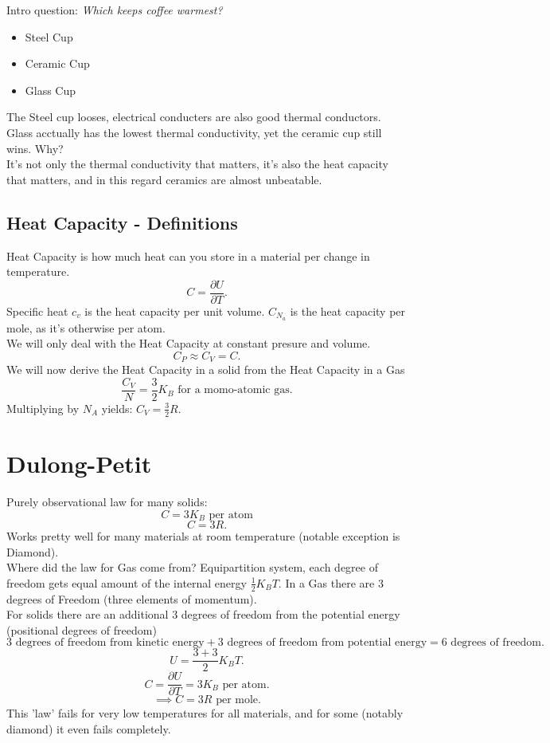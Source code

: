 \documentclass{report}
\begin{document}
Intro question: \emph{Which keeps coffee warmest?}
\begin{itemize}
	\item Steel Cup \\
	\item Ceramic Cup \\
	\item Glass Cup 
\end{itemize}
The Steel cup looses, electrical conducters are also good thermal conductors. Glass acctually has the lowest thermal conductivity, yet the ceramic cup still wins. Why? \\
It's not only the thermal conductivity that matters, it's also the heat capacity that matters, and in this regard ceramics are almost unbeatable.\\
\subsection{Heat Capacity - Definitions}
Heat Capacity is how much heat can you store in a material per change in temperature. \[
C = \frac{\partial U}{\partial T}
.\] Specific heat $c_v$ is the heat capacity per unit volume. $C_{N_a}$ is the heat capacity per mole, as it's otherwise per atom. \\
We will only deal with the Heat Capacity at constant presure and volume. \[
C_P \approx C_V = C
.\] We will now derive the Heat Capacity in a solid from the Heat Capacity in a Gas \[
\frac{C_V}{N} = \frac{3}{2} K_B \text{ for a momo-atomic gas}
.\]
Multiplying by $N_A$ yields: $C_V = \frac{3}{2} R$.
\section{Dulong-Petit}
Purely observational law for many solids: \[
C = 3 K_B \text{ per atom}
\] \[
C = 3 R
.\] Works pretty well for many materials at room temperature (notable exception is Diamond).\\
Where did the law for Gas come from? Equipartition system, each degree of freedom gets equal amount of the internal energy $\frac{1}{2} K_B T$. In a Gas there are $3$ degrees of Freedom (three elements of momentum). \\
For solids there are an additional $3$ degrees of freedom from the potential energy (positional degrees of freedom) \[
3 \text{ degrees of freedom from kinetic energy} + 3 \text{ degrees of freedom from potential energy}= 6 \text{ degrees of freedom}
.\] \[
U = \frac{3+3}{2} K_B T
.\] \[
C = \frac{\partial U}{\partial T} = 3 K_B \text{ per atom}
.\]  \[
\implies C = 3 R \text{ per mole}
.\] 
This 'law' fails for very low temperatures for all materials, and for some (notably diamond) it even fails completely.
\end{document}
